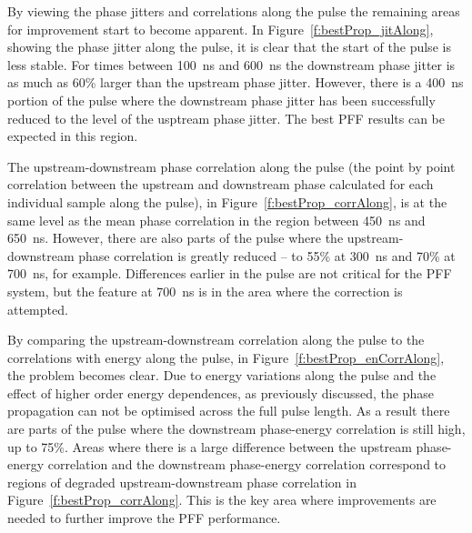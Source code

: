 By viewing the phase jitters and correlations along the pulse the remaining areas for improvement start to become apparent. In Figure~\ref{f:bestProp_jitAlong}, showing the phase jitter along the pulse, it is clear that the start of the pulse is less stable. For times between 100~ns and 600~ns the downstream phase jitter is as much as 60\% larger than the upstream phase jitter.  However, there is a 400~ns portion of the pulse where the downstream phase jitter has been successfully reduced to the level of the usptream phase jitter. The best PFF results can be expected in this region.

The upstream-downstream phase correlation along the pulse (the point by point correlation between the upstream and downstream phase calculated for each individual sample along the pulse), in Figure~\ref{f:bestProp_corrAlong}, is at the same level as the mean phase correlation in the region between 450~ns and 650~ns. However, there are also parts of the pulse where the upstream-downstream phase correlation is greatly reduced -- to 55\% at 300~ns and 70\% at 700~ns, for example. Differences earlier in the pulse are not critical for the PFF system, but the feature at 700~ns is in the area where the correction is attempted.

By comparing the upstream-downstream correlation along the pulse to the correlations with energy along the pulse, in Figure~\ref{f:bestProp_enCorrAlong}, the problem becomes clear. Due to energy variations along the pulse and the effect of higher order energy dependences, as previously discussed, the phase propagation can not be optimised across the full pulse length. As a result there are parts of the pulse where the downstream phase-energy correlation is still high, up to 75\%. Areas where there is a large difference between the upstream phase-energy correlation and the downstream phase-energy correlation correspond to regions of degraded upstream-downstream phase correlation in Figure~\ref{f:bestProp_corrAlong}. This is the key area where improvements are needed to further improve the PFF performance.

